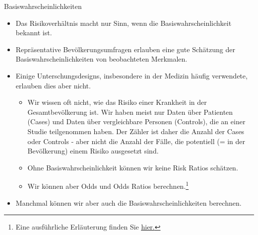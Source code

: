 \documentclass[18pt,handout, aspectratio=169]{beamer}
\begin{document}
\begin{frame}{Basiswahrscheinlichkeiten}
\begin{itemize}
  \item Das Risikoverhältnis macht nur Sinn, wenn die Basiswahrscheinlichkeit bekannt ist. 
  \item Repräsentative Bevölkerungsumfragen erlauben eine gute Schätzung der Basiswahrscheinlichkeiten von beobachteten Merkmalen. 
  \item Einige Unterschungsdesigns, insbesondere in der Medizin häufig verwendete, erlauben dies aber nicht.
  \begin{itemize}
     \item Wir wissen oft nicht, wie das Risiko einer Krankheit in der Gesamtbevölkerung ist. Wir haben meist nur Daten über Patienten (Cases) und Daten über vergleichbare Personen (Controls), die an einer Studie teilgenommen haben. Der Zähler ist daher die Anzahl der Cases oder Controls - aber nicht die Anzahl der Fälle, die potentiell (= in der Bevölkerung) einem Risiko ausgesetzt sind. 
     \item Ohne Basiswahrscheinlichkeit können wir keine Risk Ratios schätzen. 
     \item Wir können aber Odds und Odds Ratios berechnen.\footnote{Eine ausführliche Erläuterung finden Sie \href{https://stats.stackexchange.com/questions/276780/why-is-relative-risk-not-valid-in-case-control-studies}{\underline{hier}.}} 
   \end{itemize}
   \item Manchmal können wir aber auch die Basiswahrscheinlichkeiten berechnen.  
\end{itemize}

\end{frame}
\end{document}
